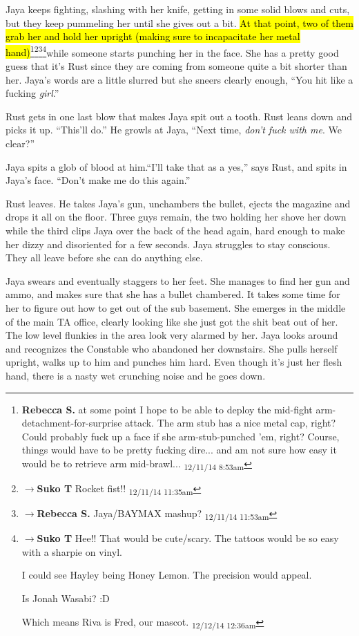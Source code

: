 Jaya keeps fighting, slashing with her knife, getting in some solid blows and cuts, but they keep pummeling her until she gives out a bit.  \hl{At that point, two of them grab her and hold her upright (making sure  to incapacitate her metal hand)}\footnote{\textbf{Rebecca S. }at some point I hope to be able to deploy the mid-fight arm-detachment-for-surprise attack.  The arm stub has a nice metal cap, right? Could probably fuck up a face if she arm-stub-punched 'em, right?  Course, things would have to be pretty fucking dire... and am not sure how easy it would be to retrieve arm mid-brawl... \textsubscript{12/11/14 8:53am}}\footnote{$\rightarrow$\textbf{Suko T }Rocket fist!! \textsubscript{12/11/14 11:35am}}\footnote{$\rightarrow$\textbf{Rebecca S. }Jaya/BAYMAX mashup? \textsubscript{12/11/14 11:53am}}\footnote{$\rightarrow$\textbf{Suko T }Hee!!  That would be cute/scary.  The tattoos would be so easy with a sharpie on vinyl.  

I could see Hayley being Honey Lemon.  The precision would appeal.

Is Jonah Wasabi? :D

Which means Riva is Fred, our mascot. \textsubscript{12/12/14 12:36am}}while someone starts punching her in the face.  She has a pretty good guess that it's Rust since they are coming from someone quite a bit shorter than her.  Jaya's words are a little slurred but she sneers clearly enough, ``You hit like a fucking \textit{girl}.''

Rust gets in one last blow that makes Jaya spit out a tooth.  Rust leans down and picks it up.  ``This'll do.''  He growls at Jaya, ``Next time, \textit{don't fuck with me}.  We clear?''

Jaya spits a glob of blood at him.``I'll take that as a yes,'' says Rust, and spits in Jaya's face.  ``Don't make me do this again.''

Rust leaves.  He takes Jaya's gun, unchambers the bullet, ejects the magazine and drops it all on the floor.  Three guys remain, the two holding her shove her down while the third clips Jaya over the back of the head again, hard enough to make her dizzy and disoriented for a few seconds.  Jaya struggles to stay conscious.  They all leave before she can do anything else.



Jaya swears and eventually staggers to her feet.  She manages to find her gun and ammo, and makes sure that she has a bullet chambered.  It takes some time for her to figure out how to get out of the sub basement.  She emerges in the middle of the main TA office, clearly looking like she just got the shit beat out of her.  The low level flunkies in the area look very alarmed by her.  Jaya looks around and recognizes the Constable who abandoned her downstairs. She pulls herself upright, walks up to him and punches him hard.  Even though it's just her flesh hand, there is a nasty wet crunching noise and he goes down.



